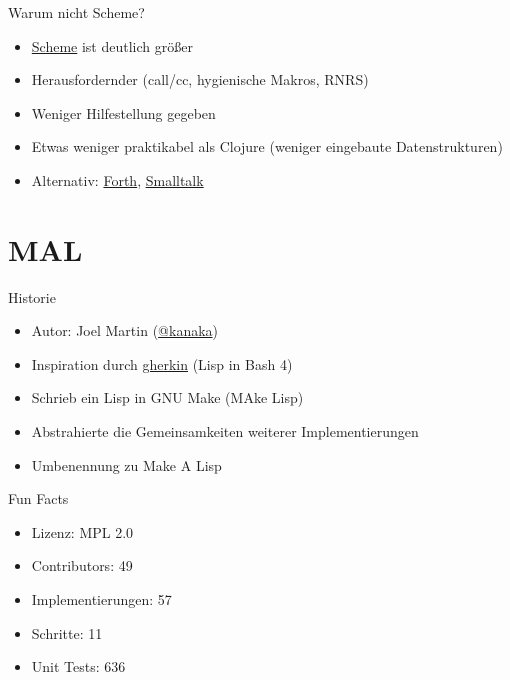 \documentclass[presentation]{beamer}
\begin{document}
\begin{frame}[label=sec-1-4]{Warum nicht Scheme?}
\begin{itemize}
\item \href{http://schemers.org/}{Scheme} ist deutlich größer
\item Herausfordernder (call/cc, hygienische Makros, RNRS)
\item Weniger Hilfestellung gegeben
\item Etwas weniger praktikabel als Clojure (weniger eingebaute Datenstrukturen)
\item Alternativ: \href{http://thinking-forth.sourceforge.net/}{Forth}, \href{http://pharo.org/}{Smalltalk}
\end{itemize}
\end{frame}

\section{MAL}
\label{sec-2}

\begin{frame}[label=sec-2-1]{Historie}
\begin{itemize}
\item Autor: Joel Martin (\href{https://github.com/kanaka}{@kanaka})
\item Inspiration durch \href{https://github.com/alandipert/gherkin}{gherkin} (Lisp in Bash 4)
\item Schrieb ein Lisp in GNU Make (MAke Lisp)
\item Abstrahierte die Gemeinsamkeiten weiterer Implementierungen
\item Umbenennung zu Make A Lisp
\end{itemize}
\end{frame}

\begin{frame}[label=sec-2-2]{Fun Facts}
\begin{itemize}
\item Lizenz: MPL 2.0
\item Contributors: 49
\item Implementierungen: 57
\item Schritte: 11
\item Unit Tests: 636
\end{itemize}
\end{frame}
\end{document}
